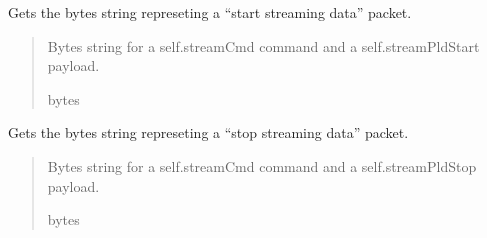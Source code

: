 \documentclass[letterpaper,10pt,english]{sphinxmanual}
\begin{document}
\begin{fulllineitems}
\begin{fulllineitems}
\end{fulllineitems}


\begin{fulllineitems}
\label{\detokenize{Morelia.Stream.Collect:Morelia.Stream.Collect.DeviceValve.Valve.GetStartBytes}}
\pysigstartsignatures
{}
\pysigstopsignatures
\sphinxAtStartPar
Gets the bytes string represeting a “start streaming data” packet.
\begin{quote}\begin{description}
\sphinxAtStartPar
Bytes string for a self.streamCmd command and a                 self.streamPldStart payload.

\sphinxAtStartPar
bytes

\end{description}\end{quote}

\end{fulllineitems}


\begin{fulllineitems}
\label{\detokenize{Morelia.Stream.Collect:Morelia.Stream.Collect.DeviceValve.Valve.GetStopBytes}}
\pysigstartsignatures
{}
\pysigstopsignatures
\sphinxAtStartPar
Gets the bytes string represeting a “stop streaming data” packet.
\begin{quote}\begin{description}
\sphinxAtStartPar
Bytes string for a self.streamCmd command and a                 self.streamPldStop payload.

\sphinxAtStartPar
bytes

\end{description}\end{quote}

\end{fulllineitems}



\end{fulllineitems}
\end{document}
